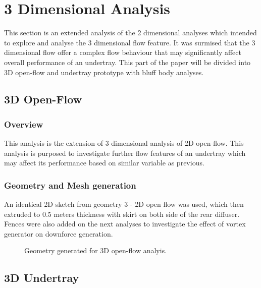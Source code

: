 \newpage
\section{3 Dimensional Analysis}
\noindent This section is an extended analysis of the 2 dimensional analyses which intended to explore and analyse the 3 dimensional flow feature. It was surmised that the 3 dimensional flow offer a complex flow behaviour that may significantly affect overall performance of an undertray. This part of the paper will be divided into 3D open-flow and undertray prototype with bluff body analyses.


\subsection{3D Open-Flow}
\subsubsection{Overview}
This analysis is the extension of 3 dimensional analysis of 2D open-flow. This analysis is purposed to investigate further flow features of an undertray which may affect its performance based on similar variable as previous.

\subsubsection{Geometry and Mesh generation}
An identical 2D sketch from geometry 3 - 2D open flow was used, which then extruded to 0.5 meters thickness with skirt on both side of the rear diffuser. Fences were also added on the next analyses to investigate the effect of vortex generator on downforce generation. 

\begin{figure}[!h]
    \centering
    \noindent{}
    \caption{Geometry generated for 3D open-flow analyis.}
    \label{fig:3D_OF_GEOM}
\end{figure}

\subsection{3D Undertray}

